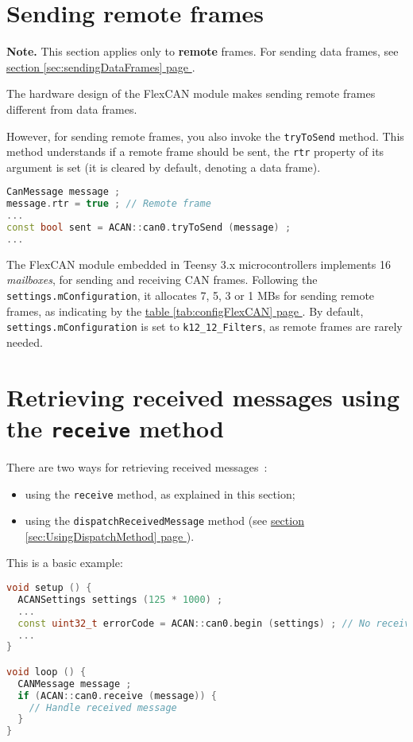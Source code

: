 \documentclass[10pt, a4paper, obeyspaces, openany]{extarticle}
\newcommand \sectionLabel[2]{\section{#1}\label{sec:#2}}
\newcommand\refSectionPage[1]{\hyperref[sec:#1]{section \ref*{sec:#1} page \pageref{sec:#1}}}
\newcommand\refTableauPage[1]{\hyperref[tab:#1]{table \ref*{tab:#1} page \pageref{tab:#1}}}
\begin{document}
\sectionLabel{Sending remote frames}{sendingRemoteFrames}

{\bf Note. } This section applies only to {\bf remote} frames. For sending data frames, see \refSectionPage{sendingDataFrames}.

The hardware design of the FlexCAN module makes sending remote frames different from data frames.

However, for sending remote frames, you also invoke the \texttt{tryToSend} method. This method understands if a remote frame should be sent, the \texttt{rtr} property of its argument is set (it is cleared by default, denoting a data frame).

{ \small\begin{lstlisting}[language=c++]
CanMessage message ;
message.rtr = true ; // Remote frame
... 
const bool sent = ACAN::can0.tryToSend (message) ;
...
\end{lstlisting}}

The FlexCAN module embedded in Teensy 3.x microcontrollers implements 16 \emph{mailboxes}, for sending and receiving CAN frames. Following the \texttt{settings.mConfiguration}, it allocates 7, 5, 3 or 1 MBs for sending remote frames, as indicating by the \refTableauPage{configFlexCAN}. By default, \texttt{settings.mConfiguration} is set to \texttt{k12\_12\_Filters}, as remote frames are rarely needed.





\sectionLabel{Retrieving received messages using the \texttt{receive} method}{UsingReceiveMethod}

There are two ways for retrieving received messages~:
\begin{itemize}
  \item using the \texttt{receive} method, as explained in this section;
  \item using the \texttt{dispatchReceivedMessage} method (see \refSectionPage{UsingDispatchMethod}).
\end{itemize}

This is a basic example:

{ \small\begin{lstlisting}[language=c++]
void setup () {
  ACANSettings settings (125 * 1000) ;
  ...
  const uint32_t errorCode = ACAN::can0.begin (settings) ; // No receive filter
  ...
}

void loop () {
  CANMessage message ;
  if (ACAN::can0.receive (message)) {
    // Handle received message
  }
}
\end{lstlisting}}
\end{document}
